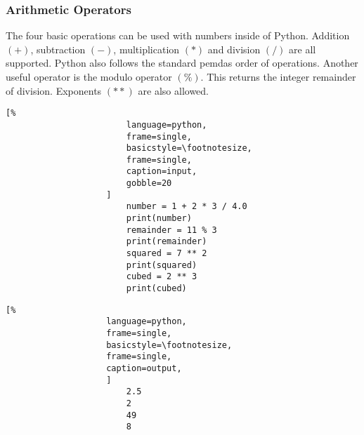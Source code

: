 \documentclass[crop=false,class=book]{standalone}
\begin{document}
            \subsubsection{Arithmetic Operators}
                The four basic operations can be used with numbers
                inside of Python. Addition $(+)$, subtraction $(-)$,
                multiplication $(*)$ and division $(/)$ are all
                supported. Python also follows the standard
                \gls{pemdas} order of operations. Another useful
                operator is the modulo operator $(\%)$. This returns
                the integer remainder of division. Exponents $(**)$
                are also allowed.\newline
                \begin{minipage}[t]{.48\textwidth}
                    \centering
                    \begin{lstlisting}[%
                        language=python,
                        frame=single,
                        basicstyle=\footnotesize,
                        frame=single,
                        caption=input,
                        gobble=20
                    ]
                        number = 1 + 2 * 3 / 4.0
                        print(number)
                        remainder = 11 % 3
                        print(remainder)
                        squared = 7 ** 2
                        print(squared)
                        cubed = 2 ** 3
                        print(cubed)
                    \end{lstlisting}
                \end{minipage}\hfill
                \begin{minipage}[t]{.48\textwidth}
                    \centering
                    \begin{lstlisting}[%
                    language=python,
                    frame=single,
                    basicstyle=\footnotesize,
                    frame=single,
                    caption=output,
                    ]
                        2.5
                        2
                        49
                        8
                    \end{lstlisting}
                \end{minipage}
\end{document}
